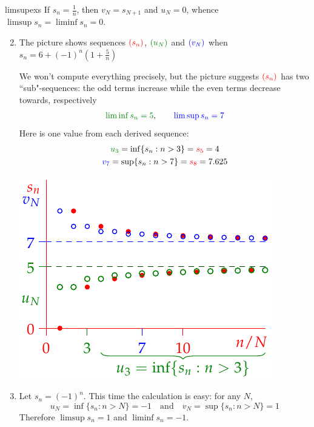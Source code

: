 \begin{examples}{}{limsupexs}
	\exstart If $s_n=\frac 1n$, then $v_N=s_{N+1}$ and $u_N=0$, whence $\limsup s_n=\liminf s_n=0$.
	
	\begin{enumerate}\setcounter{enumi}{1}
	  \item The picture shows sequences $\textcolor{red}{(s_n)}$, $\textcolor{Green}{(u_N)}$ and $\textcolor{blue}{(v_N)}$ when $s_n=6+(-1)^n\left(1+\frac 5n\right)$\par
		\begin{minipage}[t]{0.52\linewidth}\vspace{-8pt}
			We won't compute everything precisely, but the picture suggests $\textcolor{red}{(s_n)}$ has two ``sub"-sequences: the odd terms increase while the even terms decrease towards, respectively
			\[
				\textcolor{Green}{\liminf s_n=5},\qquad \textcolor{blue}{\limsup s_n=7}
			\]
			Here is one value from each derived sequence:
			\begin{gather*}
				\textcolor{Green}{u_3}=\inf\{s_n:n>3\}=\textcolor{red}{s_5}=4\\
				\textcolor{blue}{v_7}=\sup\{s_n:n>7\}=\textcolor{red}{s_8}=7.625
			\end{gather*}
		\end{minipage}
		\hfill
		\begin{minipage}[t]{0.47\linewidth}\vspace{-8pt}
			\flushright\includegraphics[scale=0.95]{limsup4}
		\end{minipage}

	
		\item Let $s_n=(-1)^n$. This time the calculation is easy: for any $N$,
		\[
			u_N=\inf\{s_n:n>N\}=-1\quad\text{and}\quad v_N=\sup\{s_n:n>N\}=1
		\]
		Therefore $\limsup s_n=1$ and $\liminf s_n=-1$.
	\end{enumerate}
\end{examples}



